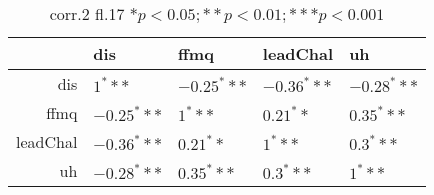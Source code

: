 \begin{table}[ht]
\centering
\begin{tabular}{rllll}
  \hline
 & dis & ffmq & leadChal & uh \\ 
  \hline
dis & $1^***$ & $-0.25^***$ & $-0.36^***$ & $-0.28^***$ \\ 
  ffmq & $-0.25^***$ & $1^***$ & $0.21^**$ & $0.35^***$ \\ 
  leadChal & $-0.36^***$ & $0.21^**$ & $1^***$ & $0.3^***$ \\ 
  uh & $-0.28^***$ & $0.35^***$ & $0.3^***$ & $1^***$ \\ 
   \hline
\end{tabular}
\caption{corr.2 fl.17 $* p < 0.05; ** p < 0.01; *** p < 0.001$} 
\end{table}
